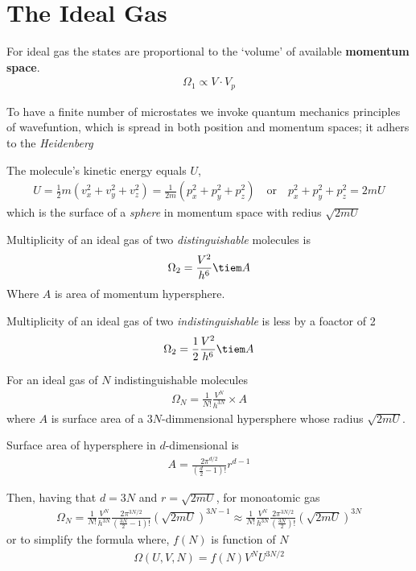 \documentclass{book}
\begin{document}
\section{The Ideal Gas}%
\label{sec:ideal gas multiplcity}

\item For ideal gas the states are proportional to the `volume' of available \textbf{momentum space}.
	\begin{align*}
		\Omega_1 \propto V \cdot V_p
	\end{align*}

\item To have a finite number of microstates we invoke quantum mechanics principles of wavefuntion,
	which is spread in both position and momentum spaces; it adhers to the \textit{Heidenberg}
\item The molecule's kinetic energy equals $U$,
	\begin{align}
		U = \frac{1}{2} m (v_x^2 + v_y^2 + v_z^2) = \frac{1}{2m} (p_x^2  + p_y^2 + p_z^2)
		\quad \text{or} \quad p_x^2  + p_y^2 + p_z^2 = 2m U
	\end{align}
	which is the surface of a \textit{sphere} in momentum space with redius $\sqrt{2mU}$

\item Multiplicity of an ideal gas of two \textit{distinguishable} molecules is
	\begin{align}
		\Omega_2 = \frac{V^2}{h^6} \tiem A
	\end{align}
	Where $A$ is area of momentum hypersphere.

\item Multiplicity of an ideal gas of two \textit{indistinguishable} is less by
	a foactor of 2
	\begin{align}
		\Omega_2 = \frac{1}{2} \frac{V^2}{h^6} \tiem A
	\end{align}


\item For an ideal gas of $N$ indistinguishable molecules
 \begin{align}
	 \Omega_N = \frac{1}{N!} \frac{V^N}{h^{3N}} \times A
 \end{align}
 where $A$ is surface area of a $3N$-dimmensional hypersphere whose radius $\sqrt{2mU}$.

\item Surface area of hypersphere in $d$-dimensional is
	\begin{align}
		A = \frac{2\pi^{d/2}}{(\frac{d}{2} - 1)!} r^{d-1}
	\end{align}

	\item Then, having that $d=3N$ and $r=\sqrt{2mU}$, for monoatomic gas
		\begin{align}
			\Omega_N = \frac{1}{N!} \frac{V^N}{h^{3N}} \frac{2\pi^{3N/2}}{(\frac{3N}{2} - 1)!}
			(\sqrt{2mU})^{3N-1} \approx
			\frac{1}{N!} \frac{V^N}{h^{3N}} \frac{2\pi^{3N/2}}{(\frac{3N}{2})!}
			(\sqrt{2mU})^{3N}
		\end{align}
		or to simplify the formula where,  $f(N)$ is function of $N$
		\begin{align}
			\Omega (U, V, N) = f(N) V^N U^{3N/2}
		\end{align}
\end{document}
